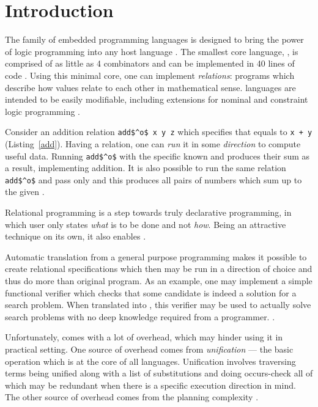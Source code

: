 \section{Introduction}

The \kan family of embedded programming languages is designed to bring the power of logic programming into any host language .
The smallest core language, \muk, is comprised of as little as 4 combinators and can be implemented in 40 lines of code .
Using this minimal core, one can implement \emph{relations}: programs which describe how values relate to each other in mathematical sense.
\kan languages are intended to be easily modifiable, including extensions for nominal and constraint logic programming .

Consider an addition relation \lstinline{add$^o$ x y z} which specifies that \z equals to \lstinline{x + y} (Listing~\ref{add}).
Having a relation, one can \emph{run} it in some \emph{direction} to compute useful data.
Running \lstinline{add$^o$} with the specific known \x and \y produces their sum as a result, implementing addition.
It is also possible to run the same relation \lstinline{add$^o$} and pass only \z and this produces all pairs of numbers which sum up to the given \z.



Relational programming is a step towards truly declarative programming, in which user only states \emph{what} is to be done and not \emph{how}.
Being an attractive technique on its own, it also enables .

Automatic translation from a general purpose programming  makes it possible to create relational specifications which then may be run in a direction of choice and thus do more than original program.
As an example, one may implement a simple functional verifier which checks that some candidate is indeed a solution for a search problem.
When translated into \mk, this verifier may be used to actually solve search problems with no deep knowledge required from a programmer. .

Unfortunately, \mk comes with a lot of overhead, which may hinder using it in practical setting.
One source of overhead comes from \emph{unification} --- the basic operation which is at the core of all \kan languages.
Unification involves traversing terms being unified along with a list of substitutions and doing occurs-check all of which may be redundant when there is a specific execution direction in mind.
The other source of overhead comes from the planning complexity .

